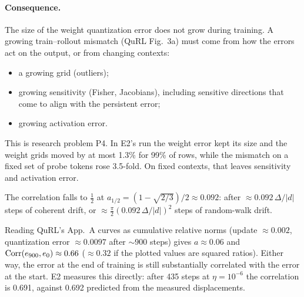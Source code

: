 \documentclass[11pt]{article}
\begin{document}
\paragraph{Consequence.} The size of the weight quantization error does not grow during training. A growing train--rollout mismatch (QuRL Fig.~3a) must come from how the errors act on the output, or from changing contexts:
\begin{itemize}
\item a growing grid (outliers);
\item growing sensitivity (Fisher, Jacobians), including sensitive directions that come to align with the persistent error;
\item growing activation error.
\end{itemize} This is research problem P4. In E2's run the weight error kept its size and the weight grids moved by at most 1.3\% for 99\% of rows, while the mismatch on a fixed set of probe tokens rose 3.5-fold. On fixed contexts, that leaves sensitivity and activation error.

\begin{corollary}\label{cor:persistence-time}
The correlation falls to $\tfrac12$ at $a_{1/2}=(1-\sqrt{2/3})/2\approx0.092$: after $\approx0.092\,\Delta/|d|$ steps of coherent drift, or $\approx\tfrac\pi2(0.092\,\Delta/|d|)^2$ steps of random-walk drift.
\end{corollary}
Reading QuRL's App.~A curves as cumulative relative norms (update $\approx0.002$, quantization error $\approx0.0097$ after ${\sim}900$ steps) gives $a\approx0.06$ and $\operatorname{Corr}(e_{900},e_0)\approx0.66$ ($\approx0.32$ if the plotted values are squared ratios). Either way, the error at the end of training is still substantially correlated with the error at the start. E2 measures this directly: after 435 steps at $\eta=10^{-6}$ the correlation is 0.691, against 0.692 predicted from the measured displacements.
\end{document}

